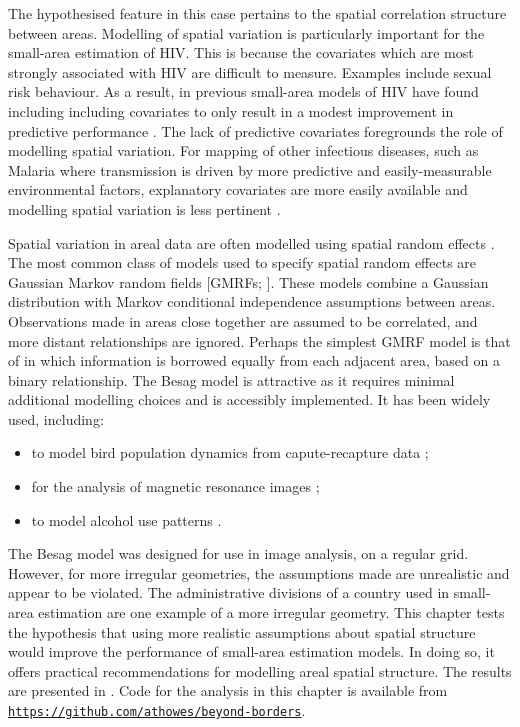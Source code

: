 \documentclass[a4paper, nobind]{templates/ociamthesis}
\providecommand{\tightlist}{%
  \setlength{\itemsep}{0pt}\setlength{\parskip}{0pt}}
\begin{document}
The hypothesised feature in this case pertains to the spatial correlation structure between areas.
Modelling of spatial variation is particularly important for the small-area estimation of HIV.
This is because the covariates which are most strongly associated with HIV are difficult to measure.
Examples include sexual risk behaviour.
As a result, in previous small-area models of HIV have found including including covariates to only result in a modest improvement in predictive performance \autocite[Supplementary Figure 20,][]{dwyer2019mapping}.
The lack of predictive covariates foregrounds the role of modelling spatial variation.
For mapping of other infectious diseases, such as Malaria where transmission is driven by more predictive and easily-measurable environmental factors, explanatory covariates are more easily available and modelling spatial variation is less pertinent \autocite{weiss2015re}.

Spatial variation in areal data are often modelled using spatial random effects \autocite{haining2003spatial,cramb2018investigation}.
The most common class of models used to specify spatial random effects are Gaussian Markov random fields {[}GMRFs; \textcite{rue2005gaussian}{]}.
These models combine a Gaussian distribution with Markov conditional independence assumptions between areas.
Observations made in areas close together are assumed to be correlated, and more distant relationships are ignored.
Perhaps the simplest GMRF model is that of \textcite{besag1991bayesian} in which information is borrowed equally from each adjacent area, based on a binary relationship.
The Besag model is attractive as it requires minimal additional modelling choices and is accessibly implemented.
It has been widely used, including:

\begin{itemize}
\tightlist
\item
  to model bird population dynamics from capute-recapture data \autocite{saracco2010modeling};
\item
  for the analysis of magnetic resonance images \autocite{gossl2001bayesian,schmid2006bayesian};
\item
  to model alcohol use patterns \autocite{dwyer2015drinking}.
\end{itemize}

The Besag model was designed for use in image analysis, on a regular grid.
However, for more irregular geometries, the assumptions made are unrealistic and appear to be violated.
The administrative divisions of a country used in small-area estimation are one example of a more irregular geometry.
This chapter tests the hypothesis that using more realistic assumptions about spatial structure would improve the performance of small-area estimation models.
In doing so, it offers practical recommendations for modelling areal spatial structure.
The results are presented in \textcite{howes2023beyond}.
Code for the analysis in this chapter is available from \href{https://github.com/athowes/beyond-borders}{\texttt{https://github.com/athowes/beyond-borders}}.
\end{document}
